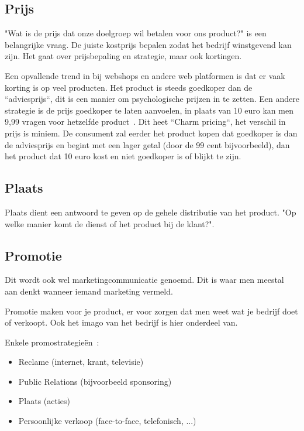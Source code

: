\subsection{Prijs}
\label{sec:marketing-prijs}
"Wat is de prijs dat onze doelgroep wil betalen voor ons product?" is een belangrijke vraag. De juiste kostprijs bepalen zodat het bedrijf winstgevend kan zijn. Het gaat over prijsbepaling en strategie, maar ook kortingen.

Een opvallende trend in bij webshops en andere web platformen is dat er vaak korting is op veel producten. Het product is steeds goedkoper dan de ``adviesprijs``, dit is een manier om psychologische prijzen in te zetten. Een andere strategie is de prijs goedkoper te laten aanvoelen, in plaats van 10 euro kan men 9,99 vragen voor hetzelfde product~\autocite{InternetMarketingUniversiteit2016}. Dit heet ``Charm pricing``, het verschil in prijs is miniem. De consument zal eerder het product kopen dat goedkoper is dan de adviesprijs en begint met een lager getal (door de 99 cent bijvoorbeeld), dan het product dat 10 euro kost en niet goedkoper is of blijkt te zijn.

\subsection{Plaats}
\label{sec:marketing-plaats}
Plaats dient een antwoord te geven op de gehele distributie van het product. "Op welke manier komt de dienst of het product bij de klant?". 

\subsection{Promotie}
\label{sec:marketing-promotie}
Dit wordt ook wel marketingcommunicatie genoemd. Dit is waar men meestal aan denkt wanneer iemand marketing vermeld.

Promotie maken voor je product, er voor zorgen dat men weet wat je bedrijf doet of verkoopt. Ook het imago van het bedrijf is hier onderdeel van.

Enkele promostrategieën~\autocite{marketingscriptie.nl2018}:
\begin{itemize}
	\item Reclame (internet, krant, televisie)
	\item Public Relations (bijvoorbeeld sponsoring)
	\item Plaats (acties)
	\item Persoonlijke verkoop (face-to-face, telefonisch, ...)
\end{itemize}

